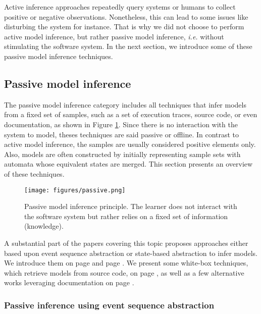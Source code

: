 Active inference approaches repeatedly query systems or humans to
collect positive or negative observations. Nonetheless, this can
lead to some issues like disturbing the system for instance.
That is why we did not choose to perform active model inference,
but rather passive model inference, \emph{i.e.} without
stimulating the software system. In the next section, we
introduce some of these passive model inference techniques.


\subsection{Passive model inference}
\label{sec:passive}

The passive model inference category includes all techniques that
infer models from a fixed set of samples, such as a set of
execution traces, source code, or even documentation, as shown in
Figure \ref{fig:passive}. Since there is no interaction with the
system to model, theses techniques are said passive or offline.
In contrast to active model inference, the samples are usually
considered positive elements only. Also, models are often
constructed by initially representing sample sets with automata
whose equivalent states are merged. This section presents an
overview of these techniques.

\begin{figure}[ht]
    \begin{center}
        \texttt{[image: figures/passive.png]}
    \end{center}

    \caption{Passive model inference principle. The learner does
    not interact with the software system but rather relies on
    a fixed set of information (knowledge).}
    \label{fig:passive}
\end{figure}

A substantial part of the papers covering this topic proposes
approaches either based upon event sequence abstraction or
state-based abstraction to infer models. We introduce them on
page \pageref{sec:passive-fsa} and page \pageref{sec:passive-spec}.
We present some white-box techniques, which retrieve
models from source code, on page \pageref{sec:passive-white}, as
well as a few alternative works leveraging documentation on page
\pageref{sec:passive-others}.

\subsubsection{Passive inference using event sequence abstraction}
\label{sec:passive-fsa}

